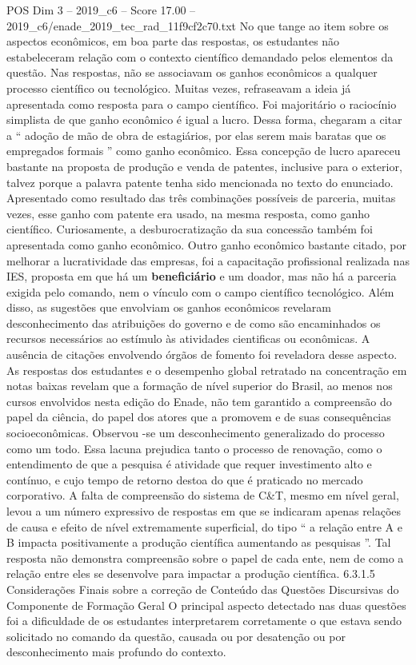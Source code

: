\begin{textsample}{POS Dim 3 – 2019\_c6 – Score 17.00 – 2019\_c6/enade\_2019\_tec\_rad\_11f9cf2c70.txt}
No que tange ao item sobre os aspectos econômicos, em boa parte das respostas, os estudantes não estabeleceram relação com o contexto científico demandado pelos elementos da questão.
Nas respostas, não se associavam os ganhos econômicos a qualquer processo científico ou tecnológico.
Muitas vezes, refraseavam a ideia já apresentada como resposta para o campo científico.
Foi majoritário o raciocínio simplista de que ganho econômico é igual a lucro.
Dessa forma, chegaram a citar a “ adoção de mão de obra de estagiários, por elas serem mais baratas que os empregados formais ” como ganho econômico.
Essa concepção de lucro apareceu bastante na proposta de produção e venda de patentes, inclusive para o exterior, talvez porque a palavra patente tenha sido mencionada no texto do enunciado.
Apresentado como resultado das três combinações possíveis de parceria, muitas vezes, esse ganho com patente era usado, na mesma resposta, como ganho científico.
Curiosamente, a desburocratização da sua concessão também foi apresentada como ganho econômico.
Outro ganho econômico bastante citado, por melhorar a lucratividade das empresas, foi a capacitação profissional realizada nas IES, proposta em que há um \textbf{beneficiário} e um doador, mas não há a parceria exigida pelo comando, nem o vínculo com o campo científico tecnológico.
Além disso, as sugestões que envolviam os ganhos econômicos revelaram desconhecimento das atribuições do governo e de como são encaminhados os recursos necessários ao estímulo às atividades cientificas ou econômicas.
A ausência de citações envolvendo órgãos de fomento foi reveladora desse aspecto.
As respostas dos estudantes e o desempenho global retratado na concentração em notas baixas revelam que a formação de nível superior do Brasil, ao menos nos cursos envolvidos nesta edição do Enade, não tem garantido a compreensão do papel da ciência, do papel dos atores que a promovem e de suas consequências socioeconômicas.
Observou -se um desconhecimento generalizado do processo como um todo.
Essa lacuna prejudica tanto o processo de renovação, como o entendimento de que a pesquisa é atividade que requer investimento alto e contínuo, e cujo tempo de retorno destoa do que é praticado no mercado corporativo.
A falta de compreensão do sistema de C\&T, mesmo em nível geral, levou a um número expressivo de respostas em que se indicaram apenas relações de causa e efeito de nível extremamente superficial, do tipo “ a relação entre A e B impacta positivamente a produção científica aumentando as pesquisas ”.
Tal resposta não demonstra compreensão sobre o papel de cada ente, nem de como a relação entre eles se desenvolve para impactar a produção científica. 6.3.1.5 Considerações Finais sobre a correção de Conteúdo das Questões Discursivas do Componente de Formação Geral O principal aspecto detectado nas duas questões foi a dificuldade de os estudantes interpretarem corretamente o que estava sendo solicitado no comando da questão, causada ou por desatenção ou por desconhecimento mais profundo do contexto.

\end{textsample}
